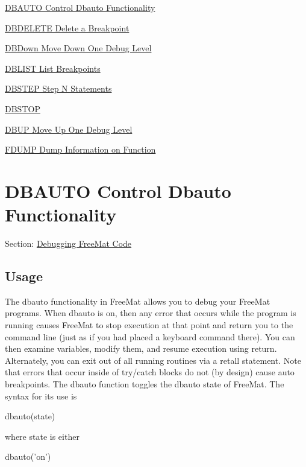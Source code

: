 
\begin{DoxyItemize}
\item \hyperlink{debug_dbauto}{D\-B\-A\-U\-T\-O Control Dbauto Functionality}  
\item \hyperlink{debug_dbdelete}{D\-B\-D\-E\-L\-E\-T\-E Delete a Breakpoint}  
\item \hyperlink{debug_dbdown}{D\-B\-Down Move Down One Debug Level}  
\item \hyperlink{debug_dblist}{D\-B\-L\-I\-S\-T List Breakpoints}  
\item \hyperlink{debug_dbstep}{D\-B\-S\-T\-E\-P Step N Statements}  
\item \hyperlink{debug_dbstop}{D\-B\-S\-T\-O\-P}  
\item \hyperlink{debug_dbup}{D\-B\-U\-P Move Up One Debug Level}  
\item \hyperlink{debug_fdump}{F\-D\-U\-M\-P Dump Information on Function}  
\end{DoxyItemize}\hypertarget{debug_dbauto}{}\section{D\-B\-A\-U\-T\-O Control Dbauto Functionality}\label{debug_dbauto}
Section\-: \hyperlink{sec_debug}{Debugging Free\-Mat Code} \hypertarget{vtkwidgets_vtkxyplotwidget_Usage}{}\subsection{Usage}\label{vtkwidgets_vtkxyplotwidget_Usage}
The dbauto functionality in Free\-Mat allows you to debug your Free\-Mat programs. When {\ttfamily dbauto} is {\ttfamily on}, then any error that occurs while the program is running causes Free\-Mat to stop execution at that point and return you to the command line (just as if you had placed a {\ttfamily keyboard} command there). You can then examine variables, modify them, and resume execution using {\ttfamily return}. Alternately, you can exit out of all running routines via a {\ttfamily retall} statement. Note that errors that occur inside of {\ttfamily try}/{\ttfamily catch} blocks do not (by design) cause auto breakpoints. The {\ttfamily dbauto} function toggles the dbauto state of Free\-Mat. The syntax for its use is \begin{DoxyVerb}   dbauto(state)
\end{DoxyVerb}
 where {\ttfamily state} is either \begin{DoxyVerb}   dbauto('on')
\end{DoxyVerb}

